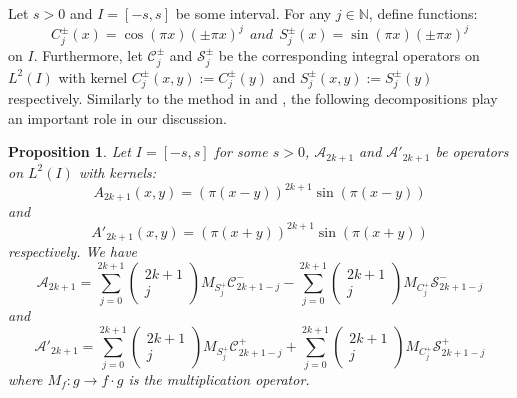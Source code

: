 \documentclass[11pt]{article}
\newtheorem{proposition}[theorem]{Proposition}
\numberwithin{equation}{section}%
\numberwithin{theorem}{section}
\begin{document}
Let $s>0$ and $I=[-s,s]$ be some interval. For any $j\in\mathbb{N}$, define functions:
\begin{equation*}
    C^\pm_{j}(x)=\cos\left(\pi x\right)\left(\pm\pi x\right)^j~~and~~ S^\pm_{j}(x)=\sin\left(\pi x\right)\left(\pm\pi x\right)^j
\end{equation*}
on $I$. Furthermore, let $\mathcal{C}^\pm_{j}$ and $\mathcal{S}^\pm_{j}$ be the corresponding integral operators on $L^2(I)$ with kernel $C^\pm_{j}(x,y):=C^\pm_{j}(y)$ and $S^\pm_{j}(x,y):=S^\pm_{j}(y)$ respectively. Similarly to the method in \cite{el2006rate} and \cite{johnstone2012fast}, the following decompositions play an important role in our discussion.
\begin{proposition}\label{CUE fact}
Let $I=[-s,s]$ for some $s>0$, $\mathcal{A}_{2k+1}$ and $\mathcal{A}'_{2k+1}$ be operators on $L^2(I)$ with kernels:
\begin{equation*}
A_{2k+1}(x,y)=(\pi(x-y))^{2k+1}\sin(\pi(x-y))
\end{equation*}
and
\begin{equation*}
A'_{2k+1}(x,y)=(\pi(x+y))^{2k+1}\sin(\pi(x+y))
\end{equation*}
respectively.
We have
\begin{equation*}
\mathcal{A}_{2k+1}=\sum_{j=0}^{2k+1}\left(\begin{matrix}
    2k+1\\
    j
\end{matrix}\right)M_{S^+_{j}}\mathcal{C}^-_{2k+1-j}-\sum_{j=0}^{2k+1}\left(\begin{matrix}
    2k+1\\
    j
\end{matrix}\right)M_{C^+_{j}}\mathcal{S}^-_{2k+1-j}
\end{equation*}
and
\begin{equation*}
\mathcal{A}'_{2k+1}=\sum_{j=0}^{2k+1}\left(\begin{matrix}
    2k+1\\
    j
\end{matrix}\right)M_{S^+_{j}}\mathcal{C}^+_{2k+1-j}+\sum_{j=0}^{2k+1}\left(\begin{matrix}
    2k+1\\
    j
\end{matrix}\right)M_{C^+_{j}}\mathcal{S}^+_{2k+1-j}
\end{equation*}
where $M_f:g\rightarrow f\cdot g$ is the multiplication operator.
\end{proposition}
\end{document}
